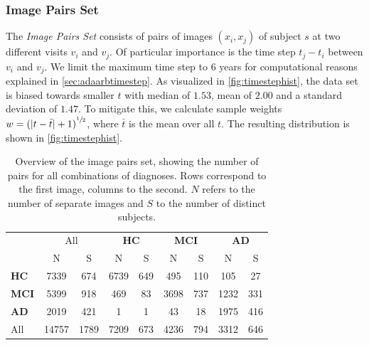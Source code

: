 \subsubsection*{Image Pairs Set} \label{sec:datpairs}
The \textit{Image Pairs Set} consists of pairs of images $(x_i, x_j)$ of subject $s$ at two different visits $v_i$ and $v_j$. Of particular importance is the time step $t_j - t_i$ between $v_i$ and $v_j$. We limit the maximum time step to 6 years for computational reasons explained in \autoref{sec:adaarbtimestep}. As visualized in \autoref{fig:timestephist}, the data set is biased towards smaller $t$ with median of $1.53$, mean of $2.00$ and a standard deviation of $1.47$. To mitigate this, we calculate sample weights $w = {(| t - \bar t | + 1)}^{\sfrac{1}{2}}$, where $\bar t$ is the mean over all $t$. The resulting distribution is shown in \autoref{fig:timestephist}.

\begin{table}
	\begin{center}
		\begin{tabular}{l c c | c c c c c c}
			\toprule
			& 
			\multicolumn{2}{c}{All} &
			\multicolumn{2}{c}{\bfseries HC} & 
			\multicolumn{2}{c}{\bfseries MCI} & 
			\multicolumn{2}{c}{\bfseries AD} \\
			\cmidrule(lr){2-3}
			\cmidrule(lr){4-5}
			\cmidrule(lr){6-7}
			\cmidrule(lr){8-9}
			& N & \multicolumn{1}{c}{S} & N & S & N & S & N & S \\ 
			\cmidrule(lr){1-9}
			\bfseries HC  &  7339 &  674 & 6739 & 649 &  495 & 110 &  105 &  27 \\
			\bfseries MCI &  5399 &  918 &  469 &  83 & 3698 & 737 & 1232 & 331 \\
			\bfseries AD  &  2019 &  421 &    1 &   1 &   43 &  18 & 1975 & 416 \\
			\cmidrule(lr){1-9}
			All           & 14757 & 1789 & 7209 & 673 & 4236 & 794 & 3312 & 646 \\
			\bottomrule
		\end{tabular}
		\caption{Overview of the image pairs set, showing the number of pairs for all combinations of diagnoses. Rows correspond to the first image, columns to the second. $N$ refers to the number of separate images and $S$ to the number of distinct subjects.}
		\label{tab:pairsset}
	\end{center}
\end{table}

